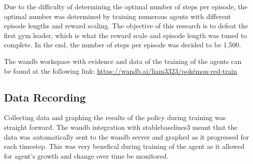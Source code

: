 Due to the difficulty of determining the optimal number of steps per episode, the optimal number was determined by training numerous agents with different episode lengths and reward scaling. The objective of this research is to defeat the first gym leader, which is what the reward scale and episode length was tuned to complete. In the end, the number of steps per episode was decided to be 1,500. 

The wandb workspace with evidence and data of the training of the agents can be found at the following link: \url{https://wandb.ai/liam3323/pokémon-red-train}

\subsection{Data Recording}

Collecting data and graphing the results of the policy during training was straight forward. The wandb integration with stablebaselines3 meant that the data was automatically sent to the wandb server and graphed as it progressed for each timestep. This was very benefical during training of the agent as it allowed for agent's growth and change over time be monitored.  
